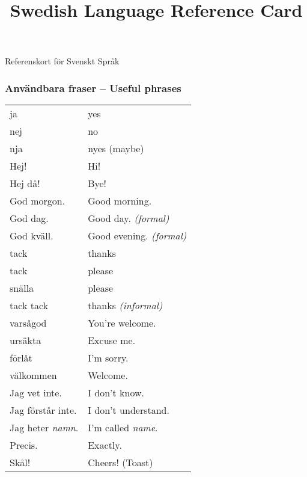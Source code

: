 \documentclass[14pt]{refcard} %
\title{Swedish Language Reference Card}
\begin{document}
\centering

\maketitle
\vspace{-1ex}
Referenskort för Svenskt Språk

\subsubsection{Användbara fraser -- Useful phrases}
\vspace{-1ex}
\begin{tabular}{ll}
ja                     & yes                            \\
nej                    & no                             \\
nja                    & nyes (maybe)                   \\ [1ex]

Hej!                   & Hi!                            \\
Hej då!                & Bye!                           \\
God morgon.            & Good morning.                  \\
God dag.               & Good day. \emph{(formal)}      \\
God kväll.             & Good evening. \emph{(formal)}  \\[1ex]

tack                   & thanks                         \\
tack                   & please                         \\
snälla                 & please                         \\
tack tack              & thanks \emph{(informal)}       \\
varsågod               & You're welcome.                \\[1ex]

ursäkta                & Excuse me.                     \\
förlåt                 & I'm sorry.                     \\[1ex]

välkommen              & Welcome.                       \\[1ex]

Jag vet inte.          & I don't know.                  \\
Jag förstår inte.      & I don't understand.            \\
Jag heter \emph{namn}. & I'm called \emph{name}.        \\[1ex]

Precis.                & Exactly.                       \\[1ex]

Skål!                  & Cheers! (Toast)                \\
\end{tabular}
\end{document}
